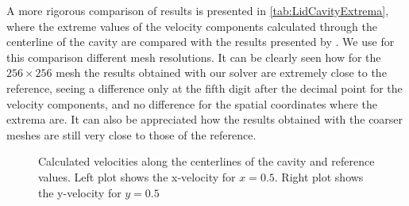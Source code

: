 A more rigorous comparison of results is presented in \cref{tab:LidCavityExtrema}, where the extreme values of the velocity components calculated through the centerline of the cavity are compared with the results presented by \cite{botellaBenchmarkSpectralResults1998}. We use for this comparison different mesh resolutions. It can be clearly seen how for the $256\times 256$ mesh the results obtained with our solver are extremely close to the reference, seeing a difference only at the fifth digit after the decimal point for the velocity components, and no difference for the spatial coordinates where the extrema are. It can also be appreciated how the results obtained with the coarser meshes are still very close to those of the reference. 

\newpage
	\begin{figure}[tb]
	\caption{Calculated velocities along the centerlines of the cavity and reference values. Left plot shows the x-velocity for $x = 0.5$. Right plot shows the y-velocity for $y = 0.5$  }
	\label{fig:LidVelocities}
\end{figure}

